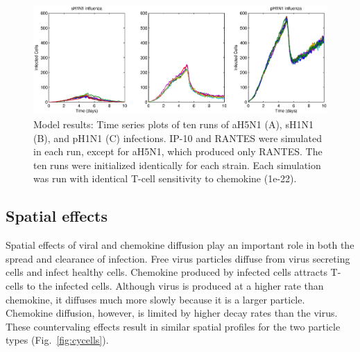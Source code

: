 \documentclass[10pt]{article}
\begin{document}
\begin{figure}[ht!]
\begin{center}
 \includegraphics[width=\textwidth]{variance}
 \end{center}
\caption{Model results: Time series plots of ten runs of aH5N1 (A), sH1N1 (B), and pH1N1 (C) infections. IP-10 and RANTES were simulated in each run, except for aH5N1, which  produced only RANTES.  The ten runs were initialized identically for each strain.  
Each simulation was run with identical T-cell sensitivity to chemokine  (1e-22).} 
 \label{fig:variance}
\end{figure}


\subsection*{Spatial effects}

Spatial effects of viral and chemokine diffusion play an important role in both the spread and clearance of infection.  Free virus particles diffuse from virus secreting cells and infect healthy cells.  Chemokine produced by infected cells attracts T-cells to the infected cells.  Although virus is produced at a higher rate than chemokine, it diffuses much more slowly because it is a larger particle.  Chemokine diffusion, however, is limited by higher decay rates than the virus.  These countervaling effects result in similar
spatial profiles for the two particle types (Fig.~\ref{fig:cycells}).
\end{document}
